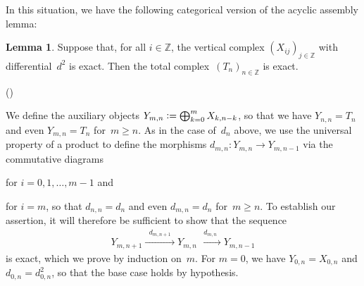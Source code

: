 \documentclass[12pt]{article}
\makeatletter
\newcounter{num}
\newenvironment{pflist}{\begin{list}{(\arabic{num})}{\usecounter{num} \leftmargin0cm \itemindent5pt}}{\end{list}}
\theoremstyle{definition}
\newtheorem{Lemma}[Satz]{Lemma}
\theoremstyle{break}
\renewenvironment{proof}[1][\proofname]{\par
\vspace{-5pt}%
\pushQED{\qed}%
\normalfont
\topsep0pt \partopsep0pt %
\trivlist
\item[\hskip\labelsep
\bfseries
#1\@addpunct{.}]\ignorespaces
}{%
\popQED\endtrivlist\@endpefalse
\addvspace{6pt plus 6pt} %
}
\newcommand{\Z}{\mathbb{Z}}
\renewcommand{\1}{\mathbbm{1}}
\newcommand{\deq}{\vcentcolon =}
\makeatother
\begin{document}
In this situation, we have the following categorical version of the acyclic assembly lemma:
\begin{Lemma} \label{AcyclAssLem}
Suppose that, for all $i \in \Z$, the vertical complex $(X_{ij})_{j \in \Z}$ with differential~$d^2$ is exact. Then the total complex~$(T_n)_{n \in \Z}$ is exact.
\end{Lemma}
\begin{proof}
\begin{pflist}
\item
We define the auxiliary objects $Y_{m,n} \deq \bigoplus_{k=0}^m X_{k,n-k}$, so that we have
$Y_{n,n} = T_n$ and even $Y_{m,n} = T_n$ for~$m \ge n$. As in the case of~$d_n$ above, we use the universal property of a product to define the morphisms \mbox{$d_{m,n} \colon Y_{m,n} \to Y_{m,n-1}$} via the commutative diagrams
\begin{center}
\end{center}
for $i = 0, 1, \dots, m - 1$ and
\begin{center}
\end{center}
for $i=m$, so that $d_{n,n} = d_n$ and even $d_{m,n} = d_n$ for~$m \ge n$. To establish our assertion, it will therefore be sufficient to show that the sequence
\begin{align*}
Y_{m,n+1} \xrightarrow{\; \; d_{m,n+1} \; \;} Y_{m,n}
\xrightarrow{\; \; d_{m,n} \; \;} Y_{m,n-1}
\end{align*}
is exact, which we prove by induction on~$m$. For $m=0$, we have
$Y_{0,n} = X_{0,n}$ and $d_{0,n} = d^2_{0,n}$, so that the base case holds by hypothesis.


\end{pflist}
\end{proof}
\end{document}

